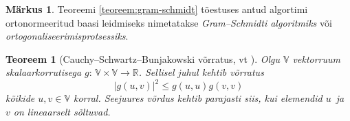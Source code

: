 \documentclass[12pt,a4paper,oneside]{article}
\theoremstyle{plain}
\newtheorem{teoreem}{Teoreem}[section]
\theoremstyle{definition}
\newtheorem{markus}{Märkus}[section]
\numberwithin{equation}{section}
\def\R{{\mathbb R}}
\def\V{{\mathbb V}}
\begin{document}
\begin{markus} \label{markus:gram-schmidt}
Teoreemi \ref{teoreem:gram-schmidt} tõestuses antud algortimi ortonormeeritud baasi 
leidmiseks nimetatakse \emph{Gram--Schmidti algoritmiks} või 
\emph{ortogonaliseerimisprotsessiks}.
\end{markus}

\begin{teoreem}[Cauchy--Schwartz--Bunjakowski võrratus, vt
\cite{FA}] \label{teoreem:C-S-B}
Olgu $\V$ vektorruum skalaarkorrutisega 
$g \colon\, \V \times \V \rightarrow \R$. Sellisel juhul 
kehtib võrratus
\begin{equation} \label{eq:C-S-B}
|g\left(u, v \right)|^2 \leq g \left(u, u \right) 
g \left(v, v \right)
\end{equation}
kõikide $u, v \in \V$ korral. Seejuures võrdus kehtib parajasti 
siis, kui elemendid \mbox{$u$ ja $v$} on lineaarselt sõltuvad.
\end{teoreem}
\end{document}
